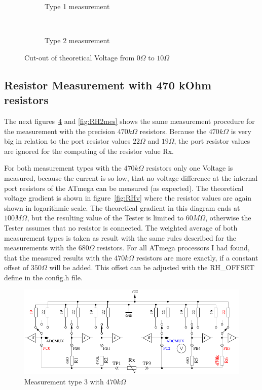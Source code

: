\begin{figure}[H]
  \begin{subfigure}[b]{9cm}
    \centering
    \resizebox{9cm}{!}{}
    \caption{Type 1 measurement}
    \label{fig:RLvlow}
  \end{subfigure}
  ~
  \begin{subfigure}[b]{9cm}
    \centering
    \resizebox{9cm}{!}{}
    \caption{Type 2 measurement}
    \label{fig:RLvhigh}
  \end{subfigure}
  \caption{Cut-out of theoretical Voltage from \(0\Omega\) to \(10\Omega\)}
\end{figure}


\subsection{Resistor Measurement with 470 kOhm resistors}
The next figures~\ref{fig:RH1mes} and \ref{fig:RH2mes} shows the same measurement procedure for the
measurement with the precision \(470k\Omega\) resistors. Because the \(470k\Omega\) is very big in relation
to the port resistor values \(22\Omega\) and \(19\Omega\), the port resistor values are ignored for the computing
of the resistor value Rx.

For both measurement types with the \(470k\Omega\) resistors only one Voltage is measured, because the current
is so low, that no voltage difference at the internal port resistors of the ATmega can be measured (as expected).
The theoretical voltage gradient is shown in figure~\ref{fig:RHv} where the resistor values are again shown in logarithmic scale.
The theoretical gradient in this diagram ends at \(100M\Omega\), but the resulting value of the Tester is
limited to \(60M\Omega\), otherwise the Tester assumes that no resistor is connected.
The weighted average of both measurement types is taken as result with the same rules described for the measurements with the \(680\Omega\) resistors.
For all ATmega processors I had found, that the measured results with the \(470k\Omega\) resistors are more exactly,
if a constant offset of \(350\Omega\) will be added.
This offset can be adjusted with the RH\_OFFSET define in the config.h file.

\begin{figure}[H]
\centering
\includegraphics[]{../FIG/ResistormessH1.pdf}
\caption{Measurement type 3 with \(470k\Omega\) }
\label{fig:RH1mes}
\end{figure}


